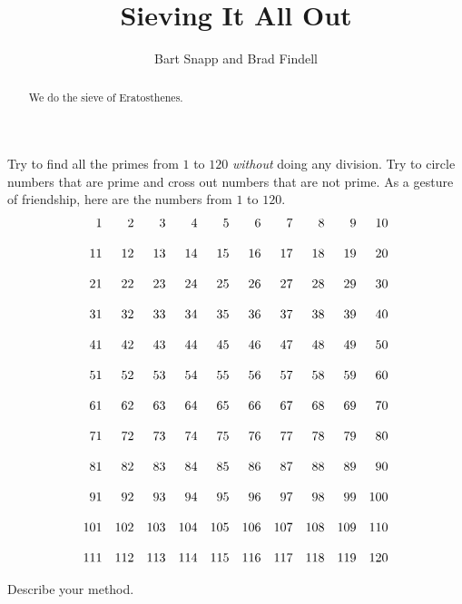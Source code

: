 \documentclass[nooutcomes]{ximera}
\title{Sieving It All Out}
\author{Bart Snapp and Brad Findell}
\begin{document}
\begin{abstract}
We do the sieve of Eratosthenes.
\end{abstract}
\maketitle
\label{A:Sieve}

\begin{problem} 
Try to find all the primes from $1$ to $120$ \textit{without}
doing any division.  Try to circle numbers that are prime and 
cross out numbers that are not prime.  
As a gesture of friendship, here are the numbers from $1$ to $120$.
\[
\begin{array}{r r r r r r r r r r}

  1 &   2 &   3 &   4 &   5 &   6 &   7 &   8 &   9 &  10\\
  \\
 11 &  12 &  13 &  14 &  15 &  16 &  17 &  18 &  19 &  20\\
 \\
 21 &  22 &  23 &  24 &  25 &  26 &  27 &  28 &  29 &  30\\
 \\
 31 &  32 &  33 &  34 &  35 &  36 &  37 &  38 &  39 &  40\\
 \\
 41 &  42 &  43 &  44 &  45 &  46 &  47 &  48 &  49 &  50\\
 \\
 51 &  52 &  53 &  54 &  55 &  56 &  57 &  58 &  59 &  60\\
 \\
 61 &  62 &  63 &  64 &  65 &  66 &  67 &  68 &  69 &  70\\
 \\
 71 &  72 &  73 &  74 &  75 &  76 &  77 &  78 &  79 &  80\\
 \\
 81 &  82 &  83 &  84 &  85 &  86 &  87 &  88 &  89 &  90\\
 \\
 91 &  92 &  93 &  94 &  95 &  96 &  97 &  98 &  99 & 100\\
 \\
101 & 102 & 103 & 104 & 105 & 106 & 107 & 108 & 109 & 110\\
\\
111 & 112 & 113 & 114 & 115 & 116 & 117 & 118 & 119 & 120\\
\end{array}
\]

Describe your method.  
\end{problem}
\end{document}
